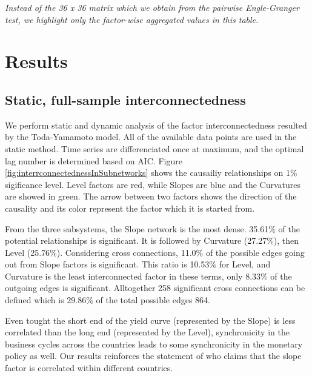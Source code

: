 \documentclass[12pt,bibliography=totoc]{article}
\begin{document}
    \begin{tablenotes}
      \small
     \item \centering \textit{Instead of the 36 x 36 matrix which we obtain from the pairwise Engle-Granger test, we highlight only the factor-wise aggregated values in this table.}
    \end{tablenotes}



\section{Results}

\subsection{Static, full-sample interconnectedness}

We perform static and dynamic analysis of the factor interconnectedness resulted by the Toda-Yamamoto model. All of the available data points are used in the static method. Time series are differenciated once at maximum, and the optimal lag number is determined based on AIC. Figure \ref{fig:interrconnectednessInSubnetworks} shows the causailiy relationships on 1\% sigificance level. Level factors are red, while Slopes are blue and the Curvatures are showed in green. The arrow between two factors shows the direction of the causality and its color represent the factor which it is started from.

From the three subsystems, the Slope network is the most dense. 35.61\% of the potential relationships is significant. It is followed by Curvature (27.27\%), then Level (25.76\%). Considering cross connections, 11.0\% of the possible edges going out from Slope factors is significant. This ratio is 10.53\% for Level, and Curvature is the least interconnected factor in these terms, only 8.33\% of the outgoing edges is significant. Alltogether 258 significant cross connections can be defined which is 29.86\% of the total possible edges 864.

Even tought the short end of the yield curve (represented by the Slope) is less correlated than the long end (represented by the Level), synchronicity in the business cycles across the countries leads to some synchronicity in the monetary policy as well. Our results reinforces the statement of \cite{kumar2011dynamics} who claims that the slope factor is correlated within different countries.
\end{document}
